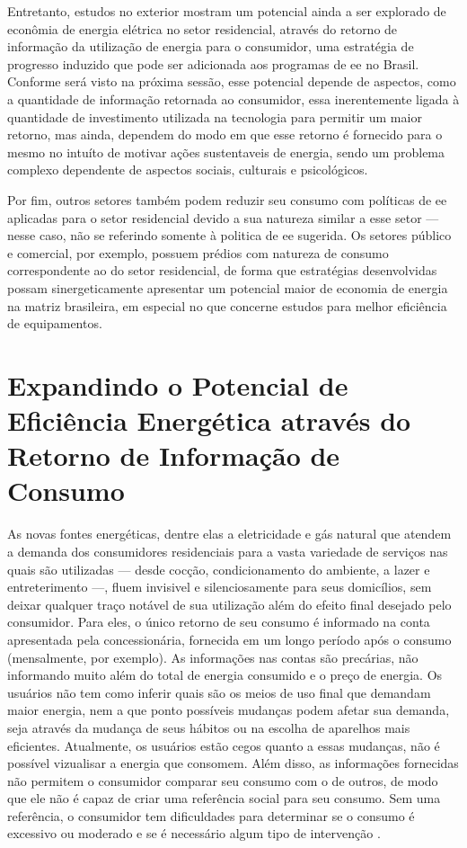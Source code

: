 Entretanto, estudos no exterior mostram um potencial ainda a ser explorado de
econômia de energia elétrica no setor residencial, através do retorno de
informação da utilização de energia para o consumidor, uma estratégia de
progresso induzido que pode ser adicionada aos programas de \gls{ee} no Brasil. 
Conforme será visto na próxima sessão, esse potencial depende de aspectos, como a quantidade 
de informação retornada ao consumidor, essa inerentemente ligada à quantidade de
investimento utilizada na tecnologia para permitir um maior retorno, mas ainda,
dependem do modo em que esse retorno é fornecido para o mesmo no intuíto de
motivar ações sustentaveis de energia, sendo um problema complexo dependente de
aspectos sociais, culturais e psicológicos. 

Por fim, outros setores também podem reduzir seu consumo com políticas de
\gls{ee} aplicadas para o setor residencial devido a sua natureza similar a esse
setor --- nesse caso, não se referindo somente à politica de \gls{ee} sugerida. 
Os setores público e comercial, por exemplo, possuem prédios com natureza
de consumo correspondente ao do setor residencial, de forma que estratégias 
desenvolvidas possam sinergeticamente apresentar um potencial maior de 
economia de energia na matriz brasileira, em especial no que concerne estudos
para melhor eficiência de equipamentos.

\section{Expandindo o Potencial de Eficiência Energética através do Retorno de
Informação de Consumo}
\label{sec:ee_res_exp}

As novas fontes energéticas, dentre elas a eletricidade e gás natural
que atendem a demanda dos consumidores residenciais para a vasta 
variedade de serviços nas quais são utilizadas 
--- desde cocção, condicionamento do ambiente, a lazer e 
entreterimento ---, fluem invisivel e silenciosamente para seus domicílios, sem
deixar qualquer traço notável de sua utilização além do efeito final desejado pelo
consumidor. Para eles, o único retorno de seu consumo é informado na conta
apresentada pela concessionária, fornecida em um longo período após o consumo
(mensalmente, por exemplo). As informações nas contas são precárias, não informando 
muito além do total de energia consumido e o preço de energia. 
Os usuários não tem como inferir quais são os meios de uso final que demandam 
maior energia, nem a que ponto possíveis mudanças podem afetar sua demanda, 
seja através da mudança de seus hábitos ou na escolha 
de aparelhos mais eficientes. Atualmente, os usuários estão cegos quanto a essas
mudanças, não é possível vizualisar a energia que consomem. Além disso, as
informações fornecidas não permitem o consumidor comparar seu consumo com o de
outros, de modo que ele não é capaz de criar uma referência social para seu consumo.
Sem uma referência, o consumidor tem dificuldades para determinar se o consumo é
excessivo ou moderado e se é necessário algum tipo de intervenção 
\cite{aceee_2010_estudos_feedback}.

